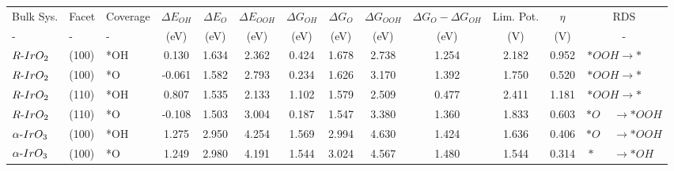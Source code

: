 \begin{tabular}{lllcccccccccc}
\toprule
                Bulk Sys. &    Facet &    Coverage & $\Delta E_{OH}$ & $\Delta E_{O}$ & $\Delta E_{OOH}$ & $\Delta G_{OH}$ & $\Delta G_{O}$ & $\Delta G_{OOH}$ & $\Delta G_{O}-\Delta G_{OH}$ & Lim. Pot. & $\eta$ &                                                                    RDS \\
                        - &        - &           - &            (eV) &           (eV) &             (eV) &            (eV) &           (eV) &             (eV) &                         (eV) &       (V) &    (V) &                                                                      - \\
\midrule
      $R{\text -}IrO_{2}$ &    (100) &         *OH &           0.130 &          1.634 &            2.362 &           0.424 &          1.678 &            2.738 &                        1.254 &     2.182 &  0.952 &              $*OOH \rightarrow * \phantom{T} \phantom{T} \phantom{T} $ \\
      $R{\text -}IrO_{2}$ &    (100) &          *O &          -0.061 &          1.582 &            2.793 &           0.234 &          1.626 &            3.170 &                        1.392 &     1.750 &  0.520 &              $*OOH \rightarrow * \phantom{T} \phantom{T} \phantom{T} $ \\
      $R{\text -}IrO_{2}$ &    (110) &         *OH &           0.807 &          1.535 &            2.133 &           1.102 &          1.579 &            2.509 &                        0.477 &     2.411 &  1.181 &              $*OOH \rightarrow * \phantom{T} \phantom{T} \phantom{T} $ \\
      $R{\text -}IrO_{2}$ &    (110) &          *O &          -0.108 &          1.503 &            3.004 &           0.187 &          1.547 &            3.380 &                        1.360 &     1.833 &  0.603 &                         $*O \phantom{T} \phantom{T}  \rightarrow *OOH$ \\
 $\alpha{\text -}IrO_{3}$ &    (100) &         *OH &           1.275 &          2.950 &            4.254 &           1.569 &          2.994 &            4.630 &                        1.424 &     1.636 &  0.406 &                         $*O \phantom{T} \phantom{T}  \rightarrow *OOH$ \\
 $\alpha{\text -}IrO_{3}$ &    (100) &          *O &           1.249 &          2.980 &            4.191 &           1.544 &          3.024 &            4.567 &                        1.480 &     1.544 &  0.314 &  $* \phantom{T} \phantom{T} \phantom{T}  \rightarrow *OH \phantom{T} $ \\

\end{tabular}
